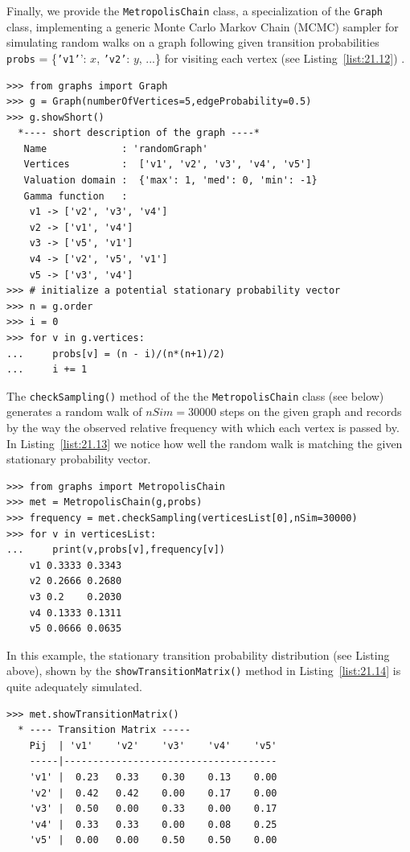 Finally, we provide the \texttt{MetropolisChain} class, a specialization of the \texttt{Graph} class, implementing a generic Monte Carlo Markov Chain (MCMC) sampler for simulating random walks on a graph following given transition probabilities \texttt{probs} = \{\texttt{'v1'}’: $x$, \texttt{'v2'}: $y$, ...\} for visiting each vertex (see Listing~\vref{list:21.12})
\citep{MET-1953}.
\begin{lstlisting}[caption={Simulating random walks on a graph},label=list:21.12]
>>> from graphs import Graph
>>> g = Graph(numberOfVertices=5,edgeProbability=0.5)
>>> g.showShort()
  *---- short description of the graph ----*
   Name             : 'randomGraph'
   Vertices         :  ['v1', 'v2', 'v3', 'v4', 'v5']
   Valuation domain :  {'max': 1, 'med': 0, 'min': -1}
   Gamma function   :
    v1 -> ['v2', 'v3', 'v4']
    v2 -> ['v1', 'v4']
    v3 -> ['v5', 'v1']
    v4 -> ['v2', 'v5', 'v1']
    v5 -> ['v3', 'v4']
>>> # initialize a potential stationary probability vector 
>>> n = g.order
>>> i = 0
>>> for v in g.vertices:
...     probs[v] = (n - i)/(n*(n+1)/2)
...     i += 1
\end{lstlisting}

The \texttt{checkSampling()} method  of the the \texttt{MetropolisChain} class (see below) generates a random walk of $nSim = 30000$ steps on the given graph and records by the way the observed relative frequency with which each vertex is passed by. In Listing~\vref{list:21.13} we notice how well the random walk is matching the given stationary probability vector.
\begin{lstlisting}[caption={Checking the quality of the MCMC sampler},label=list:21.13]
>>> from graphs import MetropolisChain     
>>> met = MetropolisChain(g,probs)
>>> frequency = met.checkSampling(verticesList[0],nSim=30000)
>>> for v in verticesList:
...     print(v,probs[v],frequency[v])   
    v1 0.3333 0.3343
    v2 0.2666 0.2680
    v3 0.2    0.2030
    v4 0.1333 0.1311
    v5 0.0666 0.0635
\end{lstlisting}

In this example, the stationary transition probability distribution (see Listing above), shown by the \texttt{showTransitionMatrix()} method in Listing~\vref{list:21.14} is quite adequately simulated.
\begin{lstlisting}[caption={Printing the transition probability distribution},label=list:21.14]
>>> met.showTransitionMatrix()
  * ---- Transition Matrix -----
    Pij  | 'v1'    'v2'    'v3'    'v4'    'v5'
    -----|-------------------------------------
    'v1' |  0.23   0.33    0.30    0.13    0.00
    'v2' |  0.42   0.42    0.00    0.17    0.00
    'v3' |  0.50   0.00    0.33    0.00    0.17
    'v4' |  0.33   0.33    0.00    0.08    0.25
    'v5' |  0.00   0.00    0.50    0.50    0.00
\end{lstlisting}


